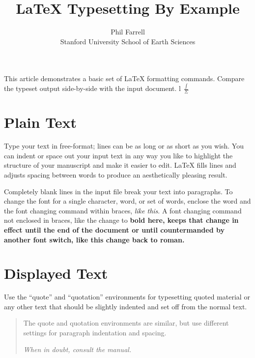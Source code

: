 \setlength{\topmargin}{-.5in}
\setlength{\textheight}{9in}
\setlength{\oddsidemargin}{.125in}
\setlength{\textwidth}{6.25in}

\title{LaTeX Typesetting By Example}
\author{Phil Farrell\\
Stanford University School of Earth Sciences}
\renewcommand{\today}{November 2, 1994}
\maketitle
This article demonstrates a basic set of LaTeX formatting commands.
Compare the typeset output side-by-side with the input document. l $\frac{\int}{\Sigma}$

\section {Plain Text}
Type your text in free-format; lines can be as long
or as short
as you wish.
      You can indent      or space out
        your input
          text in
            any way you like to highlight the structure
      of your manuscript and make it easier to edit.
LaTeX fills lines and adjusts spacing between words to produce an
aesthetically pleasing result.

Completely blank lines in the input file break your text into
paragraphs.
To change the font for a single character, word, or set of words,
enclose the word and the font changing command within braces,
{\em like this}.
A font changing command not enclosed in braces, like the change to \bf
bold here, keeps that change in effect until the end of the document or
until countermanded by another font switch, like this change back to
\rm roman. 

\section {Displayed Text}
Use the ``quote'' and ``quotation'' environments for typesetting quoted
material or any other text that should be slightly indented and set off
from the normal text.
\begin{quotation}
The quote and quotation environments are similar, but use different
settings for paragraph indentation and spacing.

\em When in doubt, consult the manual.
\end{quotation}


